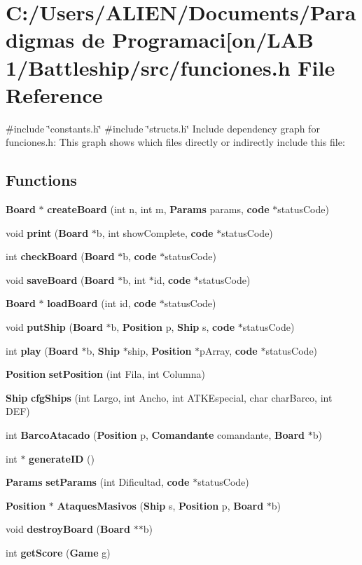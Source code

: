 \section{C\+:/\+Users/\+A\+L\+I\+E\+N/\+Documents/\+Paradigmas de Programaci[on/\+L\+AB 1/\+Battleship/src/funciones.h File Reference}
\label{funciones_8h}\index{C\+:/\+Users/\+A\+L\+I\+E\+N/\+Documents/\+Paradigmas de Programaci[on/\+L\+A\+B 1/\+Battleship/src/funciones.\+h@{C\+:/\+Users/\+A\+L\+I\+E\+N/\+Documents/\+Paradigmas de Programaci[on/\+L\+A\+B 1/\+Battleship/src/funciones.\+h}}
{\ttfamily \#include \char`\"{}constants.\+h\char`\"{}}\newline
{\ttfamily \#include \char`\"{}structs.\+h\char`\"{}}\newline
Include dependency graph for funciones.\+h\+:
This graph shows which files directly or indirectly include this file\+:
\subsection*{Functions}
\begin{DoxyCompactItemize}
\item 
{\bf Board} $\ast$ {\bf create\+Board} (int n, int m, {\bf Params} params, {\bf code} $\ast$status\+Code)
\item 
void {\bf print} ({\bf Board} $\ast$b, int show\+Complete, {\bf code} $\ast$status\+Code)
\item 
int {\bf check\+Board} ({\bf Board} $\ast$b, {\bf code} $\ast$status\+Code)
\item 
void {\bf save\+Board} ({\bf Board} $\ast$b, int $\ast$id, {\bf code} $\ast$status\+Code)
\item 
{\bf Board} $\ast$ {\bf load\+Board} (int id, {\bf code} $\ast$status\+Code)
\item 
void {\bf put\+Ship} ({\bf Board} $\ast$b, {\bf Position} p, {\bf Ship} s, {\bf code} $\ast$status\+Code)
\item 
int {\bf play} ({\bf Board} $\ast$b, {\bf Ship} $\ast$ship, {\bf Position} $\ast$p\+Array, {\bf code} $\ast$status\+Code)
\item 
{\bf Position} {\bf set\+Position} (int Fila, int Columna)
\item 
{\bf Ship} {\bf cfg\+Ships} (int Largo, int Ancho, int A\+T\+K\+Especial, char char\+Barco, int D\+EF)
\item 
int {\bf Barco\+Atacado} ({\bf Position} p, {\bf Comandante} comandante, {\bf Board} $\ast$b)
\item 
int $\ast$ {\bf generate\+ID} ()
\item 
{\bf Params} {\bf set\+Params} (int Dificultad, {\bf code} $\ast$status\+Code)
\item 
{\bf Position} $\ast$ {\bf Ataques\+Masivos} ({\bf Ship} s, {\bf Position} p, {\bf Board} $\ast$b)
\item 
void {\bf destroy\+Board} ({\bf Board} $\ast$$\ast$b)
\item 
int {\bf get\+Score} ({\bf Game} g)
\end{DoxyCompactItemize}


